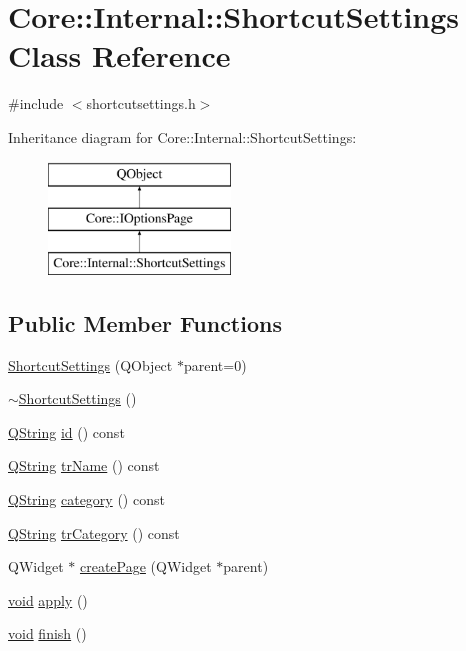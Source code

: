 \hypertarget{class_core_1_1_internal_1_1_shortcut_settings}{\section{Core\-:\-:Internal\-:\-:Shortcut\-Settings Class Reference}
\label{class_core_1_1_internal_1_1_shortcut_settings}
}


{\ttfamily \#include $<$shortcutsettings.\-h$>$}

Inheritance diagram for Core\-:\-:Internal\-:\-:Shortcut\-Settings\-:\begin{figure}[H]
\begin{center}
\leavevmode
\includegraphics[height=3.000000cm]{class_core_1_1_internal_1_1_shortcut_settings}
\end{center}
\end{figure}
\subsection*{Public Member Functions}
\begin{DoxyCompactItemize}
\item 
\hyperlink{group___core_plugin_gaf70df8ce0b86b325f7a03c1cc0dac919}{Shortcut\-Settings} (Q\-Object $\ast$parent=0)
\item 
\hyperlink{group___core_plugin_gabeeacedad8a9934f806dee1c668772f8}{$\sim$\-Shortcut\-Settings} ()
\item 
\hyperlink{group___u_a_v_objects_plugin_gab9d252f49c333c94a72f97ce3105a32d}{Q\-String} \hyperlink{group___core_plugin_ga6bf5939a71d98d6730b4be6a6dd44683}{id} () const 
\item 
\hyperlink{group___u_a_v_objects_plugin_gab9d252f49c333c94a72f97ce3105a32d}{Q\-String} \hyperlink{group___core_plugin_gac66e4afb26039d1962aafba03483d8f9}{tr\-Name} () const 
\item 
\hyperlink{group___u_a_v_objects_plugin_gab9d252f49c333c94a72f97ce3105a32d}{Q\-String} \hyperlink{group___core_plugin_gae3538343d97ec3f12f40c6850e470e69}{category} () const 
\item 
\hyperlink{group___u_a_v_objects_plugin_gab9d252f49c333c94a72f97ce3105a32d}{Q\-String} \hyperlink{group___core_plugin_ga5a6e59bc0d5312685098a6fca0ba25a1}{tr\-Category} () const 
\item 
Q\-Widget $\ast$ \hyperlink{group___core_plugin_gaf7e9d074d68e776d7620245d618d53fb}{create\-Page} (Q\-Widget $\ast$parent)
\item 
\hyperlink{group___u_a_v_objects_plugin_ga444cf2ff3f0ecbe028adce838d373f5c}{void} \hyperlink{group___core_plugin_ga9687a6a6adca6b21a1a107bb21f2413a}{apply} ()
\item 
\hyperlink{group___u_a_v_objects_plugin_ga444cf2ff3f0ecbe028adce838d373f5c}{void} \hyperlink{group___core_plugin_gaaa8b1fcc735f8ee889144706989f37b7}{finish} ()
\end{DoxyCompactItemize}

